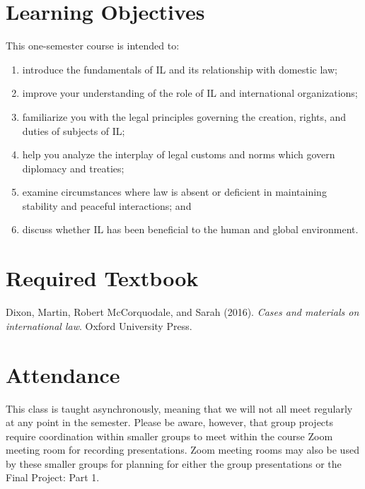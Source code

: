 \documentclass[10pt,]{article}
\providecommand{\tightlist}{%
  \setlength{\itemsep}{0pt}\setlength{\parskip}{0pt}}
\begin{document}
\hypertarget{learning-objectives}{%
\section{Learning Objectives}\label{learning-objectives}}

This one-semester course is intended to:

\begin{enumerate}
\def\labelenumi{\arabic{enumi}.}
\tightlist
\item
  introduce the fundamentals of IL and its relationship with domestic
  law;
\item
  improve your understanding of the role of IL and international
  organizations;
\item
  familiarize you with the legal principles governing the creation,
  rights, and duties of subjects of IL;
\item
  help you analyze the interplay of legal customs and norms which govern
  diplomacy and treaties;
\item
  examine circumstances where law is absent or deficient in maintaining
  stability and peaceful interactions; and
\item
  discuss whether IL has been beneficial to the human and global
  environment.
\end{enumerate}

\hypertarget{required-textbook}{%
\section{Required Textbook}\label{required-textbook}}

Dixon, Martin, Robert McCorquodale, and Sarah (2016).
\emph{Cases and materials on international law}. Oxford University
Press.

\hypertarget{attendance}{%
\section{Attendance}\label{attendance}}

This class is taught asynchronously, meaning that we will not all meet
regularly at any point in the semester. Please be aware, however, that
group projects require coordination within smaller groups to meet within
the course Zoom meeting room for recording presentations. Zoom meeting
rooms may also be used by these smaller groups for planning for either
the group presentations or the Final Project: Part 1.

\newpage
\end{document}
